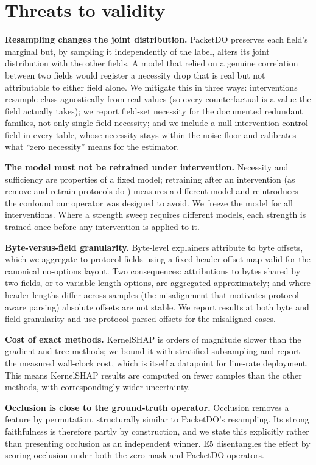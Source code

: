 \documentclass[journal]{IEEEtran}
\begin{document}
\section{Threats to validity}

\textbf{Resampling changes the joint distribution.} PacketDO preserves
each field's marginal but, by sampling it independently of the label,
alters its joint distribution with the other fields. A model that relied
on a genuine correlation between two fields would register a necessity
drop that is real but not attributable to either field alone. We
mitigate this in three ways: interventions resample class-agnostically
from real values (so every counterfactual is a value the field actually
takes); we report field-set necessity for the documented redundant
families, not only single-field necessity; and we include a
null-intervention control field in every table, whose necessity stays
within the noise floor and calibrates what ``zero necessity'' means for
the estimator.

\textbf{The model must not be retrained under intervention.} Necessity
and sufficiency are properties of a fixed model; retraining after an
intervention (as remove-and-retrain protocols do
\cite{hooker2019benchmark}) measures a different model and reintroduces
the confound our operator was designed to avoid. We freeze the model for
all interventions. Where a strength sweep requires different models,
each strength is trained once before any intervention is applied to it.

\textbf{Byte-versus-field granularity.} Byte-level explainers attribute
to byte offsets, which we aggregate to protocol fields using a fixed
header-offset map valid for the canonical no-options layout. Two
consequences: attributions to bytes shared by two fields, or to
variable-length options, are aggregated approximately; and where header
lengths differ across samples (the misalignment that motivates
protocol-aware parsing) absolute offsets are not stable. We report
results at both byte and field granularity and use protocol-parsed
offsets for the misaligned cases.

\textbf{Cost of exact methods.} KernelSHAP is orders of magnitude slower
than the gradient and tree methods; we bound it with stratified
subsampling and report the measured wall-clock cost, which is itself a
datapoint for line-rate deployment. This means KernelSHAP results are
computed on fewer samples than the other methods, with correspondingly
wider uncertainty.

\textbf{Occlusion is close to the ground-truth operator.} Occlusion
removes a feature by permutation, structurally similar to PacketDO's
resampling. Its strong faithfulness is therefore partly by construction,
and we state this explicitly rather than presenting occlusion as an
independent winner. E5 disentangles the effect by scoring occlusion
under both the zero-mask and PacketDO operators.
\end{document}

